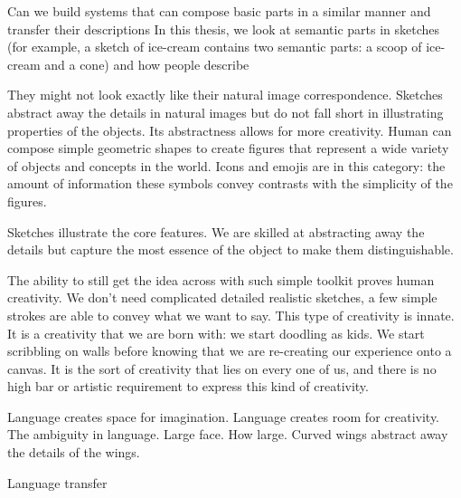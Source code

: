 Can we build systems that can compose basic parts in a similar manner and transfer their descriptions 
In this thesis, we look at semantic parts in sketches (for example, a sketch of ice-cream contains two semantic parts: a scoop of ice-cream and a cone) and how people describe 

They might not look exactly like their natural image correspondence. 
Sketches abstract away the details in natural images but do not fall short in illustrating properties of the objects. Its abstractness allows for more creativity.
Human can compose simple geometric shapes to create figures that represent a wide variety of objects and concepts in the world. Icons and emojis are in this category: the amount of information these symbols convey contrasts with the simplicity of the figures. 

Sketches illustrate the core features. We are skilled at abstracting away the details but capture the most essence of the object to make them distinguishable.

The ability to still get the idea across with such simple toolkit proves human creativity. We don't need complicated detailed realistic sketches, a few simple strokes are able to convey what we want to say. This type of creativity is innate. It is a creativity that we are born with: we start doodling as kids. We start scribbling on walls before knowing that we are re-creating our experience onto a canvas. It is the sort of creativity that lies on every one of us, and there is no high bar or artistic requirement to express this kind of creativity.

Language creates space for imagination. Language creates room for creativity. The ambiguity in language. Large face. How large. Curved wings abstract away the details of the wings.

Language transfer